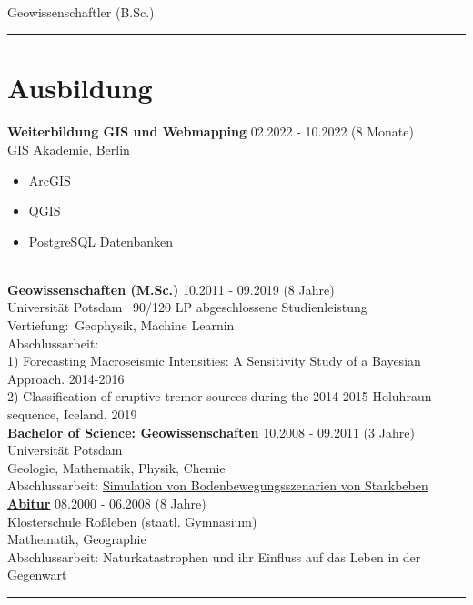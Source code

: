 \documentclass{article}
\begin{document}
\begin{minipage}{0.71\textwidth}
	{\fontsize{30pt}{62pt}\color{gray} }\\
	{\fontsize{14pt}{24pt}\color{pblue} \selectfont Geowissenschaftler \color{lightgray} (B.Sc.)}\\
	\hrule
	\vspace*{-2mm}
	\section*{\fontsize{18pt}{24pt}\selectfont \color{pblue} Ausbildung}
	\textbf{Weiterbildung GIS und Webmapping} \hfill  02.2022  - 10.2022 (8 Monate)\\
	GIS Akademie, Berlin
	\begin{itemize}
		\item ArcGIS
		\item QGIS
		\item PostgreSQL Datenbanken
	\end{itemize}\leavevmode\\
		\textbf{Geowissenschaften (M.Sc.)} \hfill  10.2011  - 09.2019 (8 Jahre)\\
		 Universität Potsdam \hfill~90/120 LP abgeschlossene Studienleistung\\
		Vertiefung:~Geophysik, Machine Learnin\\
		Abschlussarbeit:\\ 1) Forecasting Macroseismic Intensities: A Sensitivity Study of a Bayesian Approach. 2014-2016 \\
		2) Classification of eruptive tremor sources during the 2014-2015 Holuhraun sequence, Iceland. 2019\\
		
		\textbf{\href{https://www.dropbox.com/s/297g1chiby8mrd3/Bachelor-Certificate.pdf?dl=0}{Bachelor of Science: Geowissenschaften}} \hfill 10.2008 - 09.2011 (3 Jahre)\\	Universität Potsdam\\
		{Geologie, Mathematik, Physik, Chemie}\\
		{Abschlussarbeit}: \href{https://www.dropbox.com/s/3kngo4hpb0c47ww/Bachelorarbeit.pdf?dl=0}{{Simulation von Bodenbewegungsszenarien von Starkbeben}} \\
		
		\textbf{\href{https://www.dropbox.com/s/nsgmvy7o64xb9si/Abiturzeugnis.pdf?dl=0}{Abitur}} \hfill 08.2000  - 06.2008 (8 Jahre) \\Klosterschule Roßleben (staatl. Gymnasium)\\
		{Mathematik}, {Geographie}\\
		{Abschlussarbeit}: Naturkatastrophen und ihr Einfluss auf das Leben in der Gegenwart
\\
	\hrule

\end{minipage}
\end{document}
